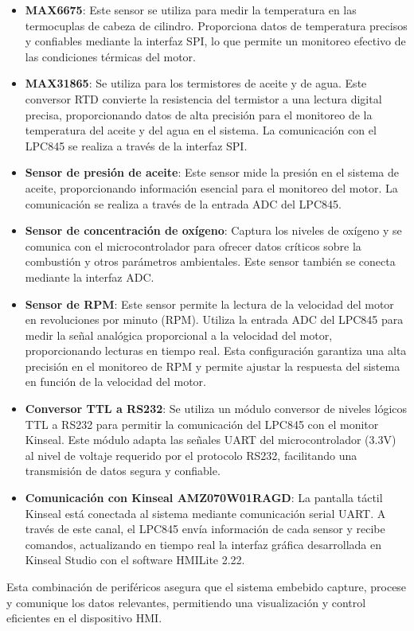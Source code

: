 \begin{itemize}
    \item \textbf{MAX6675}: Este sensor se utiliza para medir la temperatura en las termocuplas de cabeza de cilindro. Proporciona datos de temperatura precisos y confiables mediante la interfaz SPI, lo que permite un monitoreo efectivo de las condiciones térmicas del motor.
    
    \item \textbf{MAX31865}: Se utiliza para los termistores de aceite y de agua. Este conversor RTD convierte la resistencia del termistor a una lectura digital precisa, proporcionando datos de alta precisión para el monitoreo de la temperatura del aceite y del agua en el sistema. La comunicación con el LPC845 se realiza a través de la interfaz SPI.

    \item \textbf{Sensor de presión de aceite}: Este sensor mide la presión en el sistema de aceite, proporcionando información esencial para el monitoreo del motor. La comunicación se realiza a través de la entrada ADC del LPC845.

    \item \textbf{Sensor de concentración de oxígeno}: Captura los niveles de oxígeno y se comunica con el microcontrolador para ofrecer datos críticos sobre la combustión y otros parámetros ambientales. Este sensor también se conecta mediante la interfaz ADC.

    \item \textbf{Sensor de RPM}: Este sensor permite la lectura de la velocidad del motor en revoluciones por minuto (RPM). Utiliza la entrada ADC del LPC845 para medir la señal analógica proporcional a la velocidad del motor, proporcionando lecturas en tiempo real. Esta configuración garantiza una alta precisión en el monitoreo de RPM y permite ajustar la respuesta del sistema en función de la velocidad del motor.

    \item \textbf{Conversor TTL a RS232}: Se utiliza un módulo conversor de niveles lógicos TTL a RS232 para permitir la comunicación del LPC845 con el monitor Kinseal. Este módulo adapta las señales UART del microcontrolador (3.3V) al nivel de voltaje requerido por el protocolo RS232, facilitando una transmisión de datos segura y confiable.

    \item \textbf{Comunicación con Kinseal AMZ070W01RAGD}: La pantalla táctil Kinseal está conectada al sistema mediante comunicación serial UART. A través de este canal, el LPC845 envía información de cada sensor y recibe comandos, actualizando en tiempo real la interfaz gráfica desarrollada en Kinseal Studio con el software HMILite 2.22.
\end{itemize}


Esta combinación de periféricos asegura que el sistema embebido capture, procese y comunique los datos relevantes, permitiendo una visualización y control eficientes en el dispositivo HMI.
